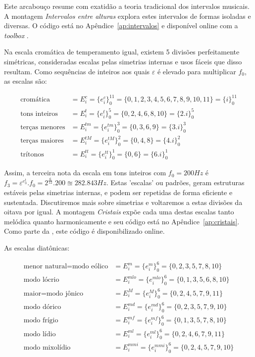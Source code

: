Este arcabouço resume com exatidão a teoria tradicional dos intervalos musicais.\cite{Lacerda} A montagem \emph{Intervalos entre alturas} explora estes intervalos de formas isoladas e diversas. O código está no Apêndice~\ref{ap:intervalos} e disponível online com a \emph{toolbox} \massa.


Na escala cromática
de temperamento igual, existem 5 divisões perfeitamente simétricas, consideradas
escalas pelas simetrias internas e usos fáceis que disso resultam. Como sequências de inteiros aos quais $\varepsilon$ é elevado
para multiplicar $f_0$, as escalas são:

\begin{equation}\label{escSim}
\begin{split}
\text{cromática} & = E_i^c = \{e_i^c\}_0^{11} =  \{0,1,2,3,4,5,6,7,8,9,10,11\} = \{i\}_0^{11}\\
\text{tons inteiros} & = E_i^t = \{e_i^t\}_0^{5} = \{0,2,4,6,8,10\} = \{2.i\}_0^{5} \\
\text{terças menores} & = E_i^{tm} = \{e_i^{tm}\}_0^{3} = \{0,3,6,9\} = \{3.i\}_0^3 \\
\text{terças maiores} & = E_i^{tM} = \{e_i^{tM}\}_0^{2} = \{0,4,8\} = \{4.i\}_0^2\\
\text{trítonos} & = E_i^{tt} = \{e_i^{tt}\}_0^{1} = \{ 0, 6 \} = \{6.i\}_0^1
\end{split}
\end{equation}

Assim, a terceira nota da escala em tons inteiros com $f_0=200Hz$
é $f_3=\varepsilon^{e_3^t} . f_0 = 2^{\frac{6}{12}} . 200 \approxeq 282.843 Hz$. Estas
'escalas' ou padrões, geram estruturas estáveis pelas simetrias internas, e podem ser
repetidas de forma eficiente e sustentada. Discutiremos mais sobre simetrias e voltaremos
a estas divisões da oitava por igual. A montagem \emph{Cristais} expõe cada uma destas escalas tanto melódica quanto harmonicamente e seu código está no Apêndice~\ref{ap:cristais}. Como parte da \massa, este código é disponibilizado online.

As escalas diatônicas:

\begin{equation}\label{eq:escalas}
\begin{split}
\text{menor natural} = \text{modo eólico} & = E_i^m = \{e_i^m\}_0^6 = \{0,2,3,5,7,8,10\} \\
\text{modo lócrio} & = E_i^{mlo} = \{e_i^{mlo}\}_0^6 = \{0,1,3,5,6,8,10\} \\ 
\text{maior}  = \text{modo jônico} & = E_i^M = \{e_i^M\}_0^6 = \{0,2,4,5,7,9,11\} \\
\text{modo dórico} & = E_i^{md} = \{e_i^{md}\}_0^6 = \{0,2,3,5,7,9,10\} \\
\text{modo frígio} & = E_i^{mf} = \{e_i^{mf}\}_0^6 = \{0,1,3,5,7,8,10\} \\
\text{modo lídio} & = E_i^{ml}=\{e_i^{ml}\}_0^6 = \{0,2,4,6,7,9,11\} \\
\text{modo mixolídio} & = E_i^{mmi} = \{e_i^{mmi}\}_0^6 = \{0,2,4,5,7,9,10\}
\end{split}
\end{equation}

